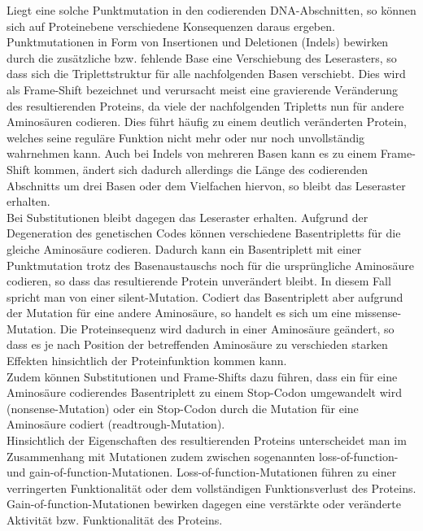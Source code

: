 Liegt eine solche Punktmutation in den codierenden DNA-Abschnitten, so können sich auf Proteinebene verschiedene Konsequenzen daraus ergeben. Punktmutationen in Form von Insertionen und Deletionen (Indels) bewirken durch die zusätzliche bzw. fehlende Base eine Verschiebung des Leserasters, so dass sich die Triplettstruktur für alle nachfolgenden Basen verschiebt. Dies wird als Frame-Shift bezeichnet und verursacht meist eine gravierende Veränderung des resultierenden Proteins, da viele der nachfolgenden Tripletts nun für andere Aminosäuren codieren. Dies führt häufig zu einem deutlich veränderten Protein, welches seine reguläre Funktion nicht mehr oder nur noch unvollständig wahrnehmen kann. Auch bei Indels von mehreren Basen kann es zu einem Frame-Shift kommen, ändert sich dadurch allerdings die Länge des codierenden Abschnitts um drei Basen oder dem Vielfachen hiervon, so bleibt das Leseraster erhalten. \\

Bei Substitutionen bleibt dagegen das Leseraster erhalten. Aufgrund der Degeneration des genetischen Codes können verschiedene Basentripletts für die gleiche Aminosäure codieren. Dadurch kann ein Basentriplett mit einer Punktmutation trotz des Basenaustauschs noch für die ursprüngliche Aminosäure codieren, so dass das resultierende Protein unverändert bleibt. In diesem Fall spricht man von einer silent-Mutation. Codiert das Basentriplett aber aufgrund der Mutation für eine andere Aminosäure, so handelt es sich um eine missense-Mutation. Die Proteinsequenz wird dadurch in einer Aminosäure geändert, so dass es je nach Position der betreffenden Aminosäure zu verschieden starken Effekten hinsichtlich der Proteinfunktion kommen kann. \\

Zudem können Substitutionen und Frame-Shifts dazu führen, dass ein für eine Aminosäure codierendes Basentriplett zu einem Stop-Codon umgewandelt wird (nonsense-Mutation) oder ein Stop-Codon durch die Mutation für eine Aminosäure codiert (readtrough-Mutation). \\

Hinsichtlich der Eigenschaften des resultierenden Proteins unterscheidet man im Zusammenhang mit Mutationen zudem zwischen sogenannten loss-of-function- und gain-of-function-Mutationen. Loss-of-function-Mutationen führen zu einer verringerten Funktionalität oder dem vollständigen Funktionsverlust des Proteins. Gain-of-function-Mutationen bewirken dagegen eine verstärkte oder veränderte Aktivität bzw. Funktionalität des Proteins. \\

